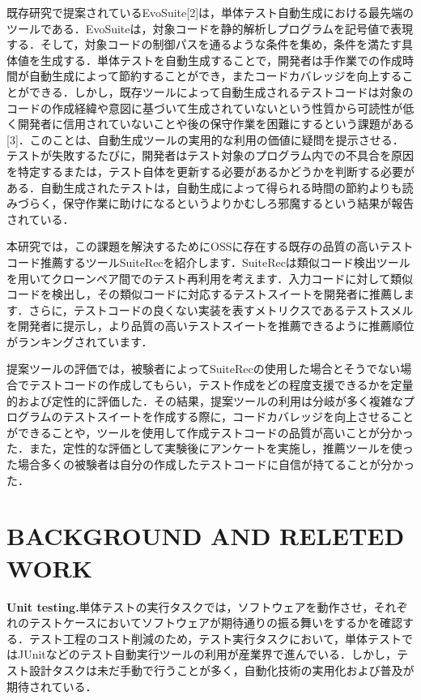 \documentclass[conference]{IEEEtran}
\begin{document}
既存研究で提案されているEvoSuite[2]は，単体テスト自動生成における最先端のツールである．EvoSuiteは，対象コードを静的解析しプログラムを記号値で表現する．そして，対象コードの制御パスを通るような条件を集め，条件を満たす具体値を生成する．単体テストを自動生成することで，開発者は手作業での作成時間が自動生成によって節約することができ，またコードカバレッジを向上することができる．しかし，既存ツールによって自動生成されるテストコードは対象のコードの作成経緯や意図に基づいて生成されていないという性質から可読性が低く開発者に信用されていないことや後の保守作業を困難にするという課題がある[3]．このことは、自動生成ツールの実用的な利用の価値に疑問を提示させる．テストが失敗するたびに，開発者はテスト対象のプログラム内での不具合を原因を特定するまたは，テスト自体を更新する必要があるかどうかを判断する必要がある．自動生成されたテストは，自動生成によって得られる時間の節約よりも読みづらく，保守作業に助けになるというよりかむしろ邪魔するという結果が報告されている．

本研究では，この課題を解決するためにOSSに存在する既存の品質の高いテストコード推薦するツールSuiteRecを紹介します．SuiteRecは類似コード検出ツールを用いてクローンペア間でのテスト再利用を考えます．入力コードに対して類似コードを検出し，その類似コードに対応するテストスイートを開発者に推薦します．さらに，テストコードの良くない実装を表すメトリクスであるテストスメルを開発者に提示し，より品質の高いテストスイートを推薦できるように推薦順位がランキングされています．

提案ツールの評価では，被験者によってSuiteRecの使用した場合とそうでない場合でテストコードの作成してもらい，テスト作成をどの程度支援できるかを定量的および定性的に評価した．その結果，提案ツールの利用は分岐が多く複雑なプログラムのテストスイートを作成する際に，コードカバレッジを向上させることができることや，ツールを使用して作成テストコードの品質が高いことが分かった．また，定性的な評価として実験後にアンケートを実施し，推薦ツールを使った場合多くの被験者は自分の作成したテストコードに自信が持てることが分かった．


\section{BACKGROUND AND RELETED WORK}
\textbf{Unit testing.}単体テストの実行タスクでは，ソフトウェアを動作させ，それぞれのテストケースにおいてソフトウェアが期待通りの振る舞いをするかを確認する．テスト工程のコスト削減のため，テスト実行タスクにおいて，単体テストではJUnitなどのテスト自動実行ツールの利用が産業界で進んでいる．しかし，テスト設計タスクは未だ手動で行うことが多く，自動化技術の実用化および普及が期待されている．
\end{document}
